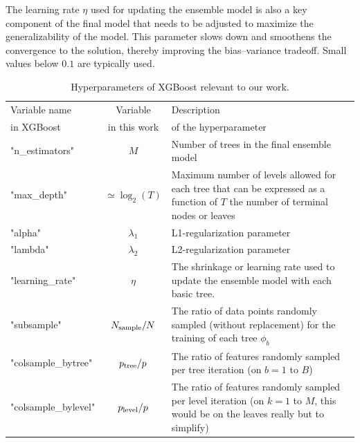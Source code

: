 \documentclass[main]{subfiles}
\begin{document}
The learning rate $\eta$ used for updating the ensemble model is also a key component of the final model that needs to be adjusted to maximize the generalizability of the model. This parameter slows down and smoothens the convergence to the solution, thereby improving the bias--variance tradeoff. Small values below $0.1$ are typically used.

\begin{table}[ht]
  \setlength{\extrarowheight}{1pt}
  \centering
  \begin{tabular}{|l|c|m{8cm}|}
  \hline
    Variable name  &  Variable   &   Description\\
    in XGBoost  &    in this work &  of the hyperparameter \\
  \hline
      "n\_estimators" &   $M$ &   Number of trees in the final ensemble model  \\
      "max\_depth" &      $\simeq\log_2(T)$ &   Maximum number of levels allowed for each tree that can be expressed as a function of $T$ the number of terminal nodes or leaves \\
      "alpha" &   $\lambda_1$ &   L1-regularization parameter  \\
      "lambda" &   $\lambda_2$ &  L2-regularization parameter  \\
      "learning\_rate" &   $\eta$ &   The shrinkage or learning rate used to update the ensemble model with each basic tree.  \\
      "subsample" &   $N_{\text{sample}}/N$ &   The ratio of data points randomly sampled (without replacement) for the training of each tree $\phi_b$  \\
      "colsample\_bytree" &   $p_{\text{tree}}/p$  &   The ratio of features randomly sampled per tree iteration (on $b=1$ to $B$)  \\
      "colsample\_bylevel" &   $p_{\text{level}}/p$  &   The ratio of features randomly sampled per level iteration (on $k=1$ to $M$, this would be on the leaves really but to simplify) \\
  \hline
  \end{tabular}
  \caption{Hyperparameters of XGBoost relevant to our work.}\label{tab:hyperparameter}
\end{table}
\end{document}
